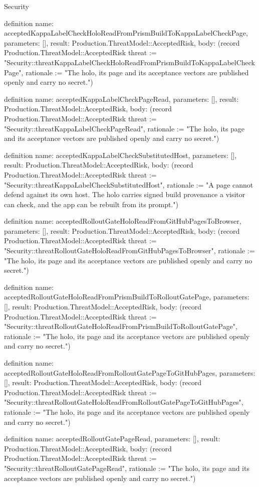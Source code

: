 \begin{lexlean}{Security}
\begin{semanticmodule}
definition{
  name: acceptedKappaLabelCheckHoloReadFromPrismBuildToKappaLabelCheckPage,
  parameters: [],
  result: Production.ThreatModel::AcceptedRisk,
  body: (record Production.ThreatModel::AcceptedRisk {threat := "Security::threatKappaLabelCheckHoloReadFromPrismBuildToKappaLabelCheckPage", rationale := "The holo, its page and its acceptance vectors are published openly and carry no secret."})
}

definition{
  name: acceptedKappaLabelCheckPageRead,
  parameters: [],
  result: Production.ThreatModel::AcceptedRisk,
  body: (record Production.ThreatModel::AcceptedRisk {threat := "Security::threatKappaLabelCheckPageRead", rationale := "The holo, its page and its acceptance vectors are published openly and carry no secret."})
}

definition{
  name: acceptedKappaLabelCheckSubstitutedHost,
  parameters: [],
  result: Production.ThreatModel::AcceptedRisk,
  body: (record Production.ThreatModel::AcceptedRisk {threat := "Security::threatKappaLabelCheckSubstitutedHost", rationale := "A page cannot defend against its own host. The holo carries signed build provenance a visitor can check, and the app can be rebuilt from its prompt."})
}

definition{
  name: acceptedRolloutGateHoloReadFromGitHubPagesToBrowser,
  parameters: [],
  result: Production.ThreatModel::AcceptedRisk,
  body: (record Production.ThreatModel::AcceptedRisk {threat := "Security::threatRolloutGateHoloReadFromGitHubPagesToBrowser", rationale := "The holo, its page and its acceptance vectors are published openly and carry no secret."})
}

definition{
  name: acceptedRolloutGateHoloReadFromPrismBuildToRolloutGatePage,
  parameters: [],
  result: Production.ThreatModel::AcceptedRisk,
  body: (record Production.ThreatModel::AcceptedRisk {threat := "Security::threatRolloutGateHoloReadFromPrismBuildToRolloutGatePage", rationale := "The holo, its page and its acceptance vectors are published openly and carry no secret."})
}

definition{
  name: acceptedRolloutGateHoloReadFromRolloutGatePageToGitHubPages,
  parameters: [],
  result: Production.ThreatModel::AcceptedRisk,
  body: (record Production.ThreatModel::AcceptedRisk {threat := "Security::threatRolloutGateHoloReadFromRolloutGatePageToGitHubPages", rationale := "The holo, its page and its acceptance vectors are published openly and carry no secret."})
}

definition{
  name: acceptedRolloutGatePageRead,
  parameters: [],
  result: Production.ThreatModel::AcceptedRisk,
  body: (record Production.ThreatModel::AcceptedRisk {threat := "Security::threatRolloutGatePageRead", rationale := "The holo, its page and its acceptance vectors are published openly and carry no secret."})
}


\end{semanticmodule}
\end{lexlean}

